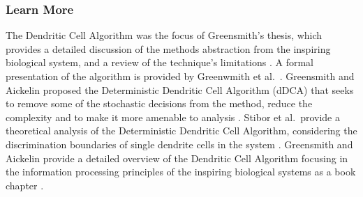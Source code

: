 % 
% 
\subsubsection{Learn More}
The Dendritic Cell Algorithm was the focus of Greensmith's thesis, which provides a detailed discussion of the methods abstraction from the inspiring biological system, and a review of the technique's limitations \cite{Greensmith2007}. 
A formal presentation of the algorithm is provided by Greenwmith et al.\ \cite{Greensmith2006a}.
Greensmith and Aickelin proposed the Deterministic Dendritic Cell Algorithm (dDCA) that seeks to remove some of the stochastic decisions from the method, reduce the complexity and to make it more amenable to analysis \cite{Greensmith2008}.
Stibor et al.\ provide a theoretical analysis of the Deterministic Dendritic Cell Algorithm, considering the discrimination boundaries of single dendrite cells in the system \cite{Stibor2009}. 
Greensmith and Aickelin provide a detailed overview of the Dendritic Cell Algorithm focusing in the information processing principles of the inspiring biological systems as a book chapter \cite{Greensmith2009}.


